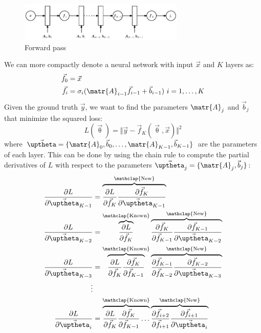 \begin{figure}[H]
    \centering
    \includegraphics[width=0.7\textwidth]{img/_forward_pass.pdf}
    \caption{Forward pass}
\end{figure}

We can more compactly denote a neural network with input $\vec{x}$ and $K$ layers as:
\[ 
    \begin{split}
        \vec{f}_0 &= \vec{x} \\
        \vec{f}_i &= \sigma_i(\matr{A}_{i-1} \vec{f}_{i-1} + \vec{b}_{i-1}) \text{ } i=1, \dots, K
    \end{split}
\]
Given the ground truth $\vec{y}$, we want to find the parameters $\matr{A}_j$ and $\vec{b}_j$ that minimize the squared loss:
\[ L(\vec{\uptheta}) = \Vert \vec{y} - \vec{f}_K(\vec{\uptheta}, \vec{x}) \Vert^2 \]
where $\vec{\uptheta} = \{ \matr{A}_{0}, \vec{b}_{0}, \dots, \matr{A}_{K-1}, \vec{b}_{K-1} \}$ are the parameters of each layer.
This can be done by using the chain rule to compute the partial derivatives of $L$ with respect to the parameters $\vec{\uptheta}_j = \{ \matr{A}_j, \vec{b}_j \}$:
\[
    \begin{split}
        \frac{\partial L}{\partial \vec{\uptheta}_{K-1}} &= 
            \overbrace{\frac{\partial L}{\partial \vec{f}_K} \frac{\partial \vec{f}_K}{\partial \vec{\uptheta}_{K-1}}}^{\mathclap{\text{New}}} \\
        \frac{\partial L}{\partial \vec{\uptheta}_{K-2}} &= 
            \overbrace{\frac{\partial L}{\partial \vec{f}_K}}^{\mathclap{\text{Known}}}
            \overbrace{\frac{\partial \vec{f}_K}{\partial \vec{f}_{K-1}} \frac{\partial \vec{f}_{K-1}}{\partial \vec{\uptheta}_{K-2}}}^{\mathclap{\text{New}}} \\
        \frac{\partial L}{\partial \vec{\uptheta}_{K-3}} &= 
            \overbrace{\frac{\partial L}{\partial \vec{f}_K} \frac{\partial \vec{f}_K}{\partial \vec{f}_{K-1}}}^{\mathclap{\text{Known}}}
            \overbrace{\frac{\partial \vec{f}_{K-1}}{\partial \vec{f}_{K-2}} \frac{\partial \vec{f}_{K-2}}{\partial \vec{\uptheta}_{K-3}}}^{\mathclap{\text{New}}} \\
        \vdots \\
        \frac{\partial L}{\partial \vec{\uptheta}_{i}} &= 
            \overbrace{\frac{\partial L}{\partial \vec{f}_K} \frac{\partial \vec{f}_K}{\partial \vec{f}_{K-1}} \dots}^{\mathclap{\text{Known}}}
            \overbrace{\frac{\partial \vec{f}_{i+2}}{\partial \vec{f}_{i+1}} \frac{\partial \vec{f}_{i+1}}{\partial \vec{\uptheta}_{i}}}^{\mathclap{\text{New}}}
    \end{split}
\]

